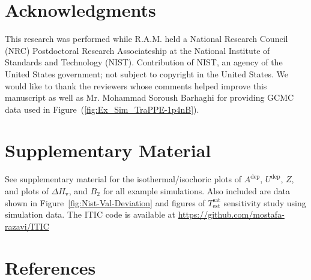 \documentclass[5p,times]{elsarticle}
\begin{document}
\section{Acknowledgments}
This research was performed while R.A.M. held a National Research Council (NRC) Postdoctoral Research Associateship at the National Institute of Standards and Technology (NIST). Contribution of NIST, an agency of the United States government; not subject to copyright in the United States. We would like to thank the reviewers whose comments helped improve this manuscript as well as Mr. Mohammad Soroush Barhaghi for providing GCMC data used in Figure~(\ref{fig:Ex_Sim_TraPPE-1p4nB}). 


\section{Supplementary Material} \label{sec:SupMat} 
See supplementary material for the isothermal/isochoric plots of $A^{\mathrm{dep}}$, $U^{\mathrm{dep}}$, $Z$, and plots of $\Delta H_{\mathrm{v}}$, and $B_2$ for all example simulations. Also included are data shown in Figure~\ref{fig:Nist-Val-Deviation} and figures of $T^\mathrm{sat}_\mathrm{est}$ sensitivity study using simulation data. The ITIC code is available at \url{https://github.com/mostafa-razavi/ITIC}

\section{References} \label{sec:ref} 


\end{document}
